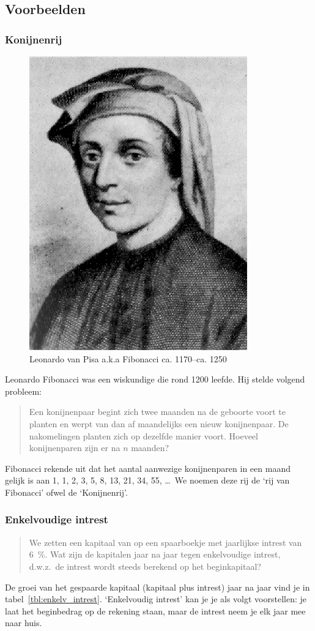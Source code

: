 \subsection{Voorbeelden}
\label{subsec:voorbeelden_rijen}
\subsubsection*{Konijnenrij}
\begin{figure}[htbp]
\centering
\includegraphics[scale=1]{figuren/rijen/Fibonacci.jpg} 
\caption{Leonardo van Pisa a.k.a Fibonacci ca. 1170--ca. 1250}
\end{figure}
Leonardo Fibonacci was een wiskundige die rond 1200 leefde. Hij stelde volgend probleem:
\begin{quote}
Een konijnenpaar begint zich twee maanden na de geboorte voort te planten en werpt van dan af maandelijks een nieuw konijnenpaar. De nakomelingen planten zich op dezelfde manier voort. Hoeveel konijnenparen zijn er na $n$ maanden?
\end{quote}

Fibonacci rekende uit dat het aantal aanwezige konijnenparen in een maand gelijk is aan 1, 1, 2, 3, 5, 8, 13, 21, 34, 55, \dots  \ We noemen deze rij de `rij van Fibonacci' ofwel de `Konijnenrij'.


\subsubsection*{Enkelvoudige intrest}
\begin{quote}
    We zetten een kapitaal van  op een spaarboekje met
    jaarlijkse intrest van \SI{6}{\percent}. Wat zijn de kapitalen jaar
    na jaar  tegen enkelvoudige intrest, d.w.z.\ de intrest
    wordt steeds berekend op het beginkapitaal?
\end{quote}
\label{page:intrest}
De groei van het gespaarde kapitaal (kapitaal plus intrest) jaar na jaar vind je in tabel~\ref{tbl:enkelv_intrest}. `Enkelvoudig intrest' kan je je als volgt voorstellen: je laat het beginbedrag op de rekening staan, maar de intrest neem je elk jaar mee naar huis.

